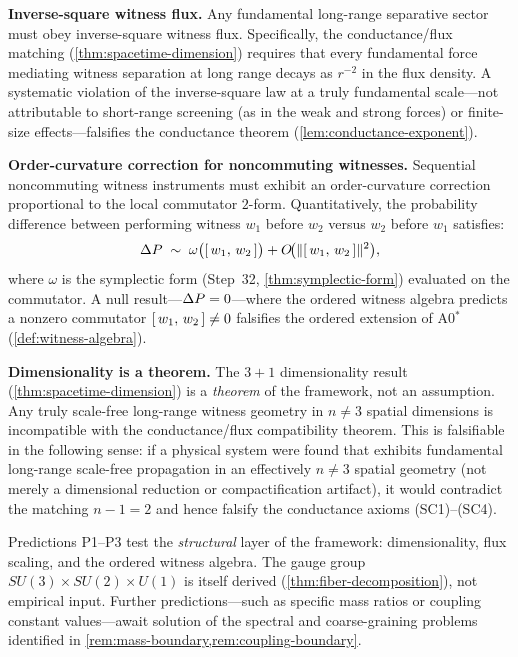 \begin{description}[leftmargin=2em, labelwidth=2em, labelsep=0.5em]

\item[\textbf{P1.}] \textbf{Inverse-square witness flux.}\;
Any fundamental long-range separative sector must obey inverse-square
witness flux.  Specifically, the conductance/flux matching
(\cref{thm:spacetime-dimension}) requires that every fundamental force
mediating witness separation at long range decays as $r^{-2}$ in the
flux density.  A systematic violation of the inverse-square law at a
truly fundamental scale---not attributable to short-range screening
(as in the weak and strong forces) or finite-size effects---falsifies
the conductance theorem (\cref{lem:conductance-exponent}).

\item[\textbf{P2.}] \textbf{Order-curvature correction for noncommuting
witnesses.}\;
Sequential noncommuting witness instruments must exhibit an
order-curvature correction proportional to the local commutator
$2$-form.  Quantitatively, the probability difference between performing
witness $w_1$ before $w_2$ versus $w_2$ before $w_1$ satisfies:
\[
  \Delta P \;\sim\; \omega\bigl([\,w_1,\,w_2\,]\bigr)
  + O\!\bigl(\|[\,w_1,\,w_2\,]\|^2\bigr),
\]
where $\omega$ is the symplectic form (Step~32, \cref{thm:symplectic-form})
evaluated on the commutator.  A null result---$\Delta P = 0$---where
the ordered witness algebra predicts a nonzero commutator
$[\,w_1,\,w_2\,] \neq 0$ falsifies the ordered extension of
A0$^*$ (\cref{def:witness-algebra}).

\item[\textbf{P3.}] \textbf{Dimensionality is a theorem.}\;
The $3+1$ dimensionality result (\cref{thm:spacetime-dimension}) is a
\emph{theorem} of the framework, not an assumption.  Any truly
scale-free long-range witness geometry in $n \neq 3$ spatial dimensions
is incompatible with the conductance/flux compatibility theorem.  This
is falsifiable in the following sense: if a physical system were found
that exhibits fundamental long-range scale-free propagation in an
effectively $n \neq 3$ spatial geometry (not merely a dimensional
reduction or compactification artifact), it would contradict the matching
$n - 1 = 2$ and hence falsify the conductance axioms (SC1)--(SC4).

\end{description}

\begin{remark}
\label{rem:prediction-scope}
Predictions P1--P3 test the \emph{structural} layer of the framework:
dimensionality, flux scaling, and the ordered witness algebra.  The
gauge group $SU(3) \times SU(2) \times U(1)$ is itself derived
(\cref{thm:fiber-decomposition}), not empirical input.
Further predictions---such
as specific mass ratios or coupling constant values---await solution of the
spectral and coarse-graining problems identified in
\cref{rem:mass-boundary,rem:coupling-boundary}.
\end{remark}

